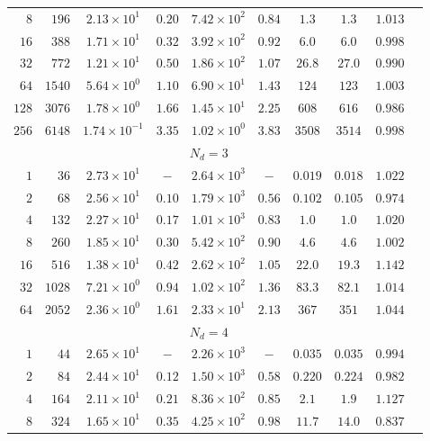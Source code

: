 \begin{table}[htbp]
\begin{tabular}{rr ccc cc cc c}
$8$ & $196$ & $2.13\times 10^{1}$ & $0.20$ & $7.42\times 10^{2}$ & $0.84$ & $1.3$ & $1.3$ & $1.013$ \\
$16$ & $388$ & $1.71\times 10^{1}$ & $0.32$ & $3.92\times 10^{2}$ & $0.92$ & $6.0$ & $6.0$ & $0.998$ \\
$32$ & $772$ & $1.21\times 10^{1}$ & $0.50$ & $1.86\times 10^{2}$ & $1.07$ & $26.8$ & $27.0$ & $0.990$ \\
$64$ & $1540$ & $5.64\times 10^{0}$ & $1.10$ & $6.90\times 10^{1}$ & $1.43$ & $124$ & $123$ & $1.003$ \\
$128$ & $3076$ & $1.78\times 10^{0}$ & $1.66$ & $1.45\times 10^{1}$ & $2.25$ & $608$ & $616$ & $0.986$ \\
$256$ & $6148$ & $1.74\times 10^{-1}$ & $3.35$ & $1.02\times 10^{0}$ & $3.83$ & $3508$ & $3514$ & $0.998$ \\
\midrule
\multicolumn{9}{c}{\textbf{$N_d = 3$}} \\
\midrule
$1$ & $36$ & $2.73\times 10^{1}$ & $-$ & $2.64\times 10^{3}$ & $-$ & $0.019$ & $0.018$ & $1.022$ \\
$2$ & $68$ & $2.56\times 10^{1}$ & $0.10$ & $1.79\times 10^{3}$ & $0.56$ & $0.102$ & $0.105$ & $0.974$ \\
$4$ & $132$ & $2.27\times 10^{1}$ & $0.17$ & $1.01\times 10^{3}$ & $0.83$ & $1.0$ & $1.0$ & $1.020$ \\
$8$ & $260$ & $1.85\times 10^{1}$ & $0.30$ & $5.42\times 10^{2}$ & $0.90$ & $4.6$ & $4.6$ & $1.002$ \\
$16$ & $516$ & $1.38\times 10^{1}$ & $0.42$ & $2.62\times 10^{2}$ & $1.05$ & $22.0$ & $19.3$ & $1.142$ \\
$32$ & $1028$ & $7.21\times 10^{0}$ & $0.94$ & $1.02\times 10^{2}$ & $1.36$ & $83.3$ & $82.1$ & $1.014$ \\
$64$ & $2052$ & $2.36\times 10^{0}$ & $1.61$ & $2.33\times 10^{1}$ & $2.13$ & $367$ & $351$ & $1.044$ \\
\midrule
\multicolumn{9}{c}{\textbf{$N_d = 4$}} \\
\midrule
$1$ & $44$ & $2.65\times 10^{1}$ & $-$ & $2.26\times 10^{3}$ & $-$ & $0.035$ & $0.035$ & $0.994$ \\
$2$ & $84$ & $2.44\times 10^{1}$ & $0.12$ & $1.50\times 10^{3}$ & $0.58$ & $0.220$ & $0.224$ & $0.982$ \\
$4$ & $164$ & $2.11\times 10^{1}$ & $0.21$ & $8.36\times 10^{2}$ & $0.85$ & $2.1$ & $1.9$ & $1.127$ \\
$8$ & $324$ & $1.65\times 10^{1}$ & $0.35$ & $4.25\times 10^{2}$ & $0.98$ & $11.7$ & $14.0$ & $0.837$ \\

\end{tabular}
\end{table}
